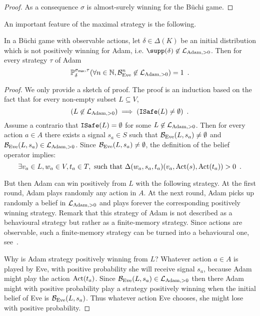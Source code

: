 \begin{proof}
As a consequence $\sigma$ is almost-surely winning for the 
B{\"u}chi game.
\end{proof}


An important feature of the maximal strategy is the following.
\begin{lemma}
In a B{\"u}chi game
with observable actions,
let $\delta\in\Delta(K)$ be an initial distribution which is not positively 
winning for Adam,
i.e. $\supp(\delta)\not\in\LLA$.
Then for every strategy $\tau$ of Adam
\begin{equation}
\label{eq:LLstable}
\mathbb{P}^{\sigma_{\textsf{max}},\tau}_{\delta}(\forall n \in \mathbb{N}, \mathcal{B}_{\text{Eve}}^n \not\in\mathcal{L}_{\text{Adam},>0} )=1\enspace.
\end{equation}
\end{lemma}
\begin{proof}
We only provide a sketch of proof.
The proof is an induction based on the fact that for every non-empty subset $L\subseteq V$,
\[
(L\not \in \mathcal{L}_{\text{Adam},>0}) \implies ({\tt ISafe}(L)\neq \emptyset)\enspace.
\]
Assume a contrario that ${\tt ISafe}(L) = \emptyset$ for some $L\not \in \mathcal{L}_{\text{Adam},>0}$.
Then for every action $a\in A$ there exists a signal $s_a\in S$
such that $\mathcal{B}_{\text{Eve}}(L,s_a)\neq \emptyset$ and $\mathcal{B}_{\text{Eve}}(L,s_a) \in \mathcal{L}_{\text{Adam},>0}$.
Since $\mathcal{B}_{\text{Eve}}(L,s_a)\neq \emptyset$, the definition of the belief operator implies:
\[
\exists v_a\in L, w_a\in V,  t_a \in T, \text{ such that }  \Delta(w_a,s_a,t_a)(v_a,\text{Act}(s),\text{Act}(t_a)) > 0\enspace.
\]

But then Adam can win positively from $L$ with the following strategy.
At the first round, Adam plays randomly any action in $A$.
At the next round, Adam picks up randomly a belief in  $\mathcal{L}_{\text{Adam},>0}$ and 
plays forever the corresponding positively winning strategy.
Remark that this strategy of Adam is not described as a behavioural strategy
but rather as a finite-memory strategy. Since actions are observable,
such a finite-memory strategy can be turned into a behavioural one,
see~\cite[Lemma 4.6 and 4.7]{BGGjacm}.

Why is Adam strategy positively winning from $L$?
Whatever action $a\in A$ is played by Eve,
with positive probability she will receive signal $s_a$,
because Adam might play the action $\text{Act}(t_a)$.
Since $\mathcal{B}_{\text{Eve}}(L,s_a) \in \mathcal{L}_{\text{Adam},>0}$ then there Adam might with positive probability
play a strategy positively winning when the initial belief
of Eve is $\mathcal{B}_{\text{Eve}}(L,s_a)$. Thus whatever action Eve chooses,
she might lose with positive probability.

\end{proof}

